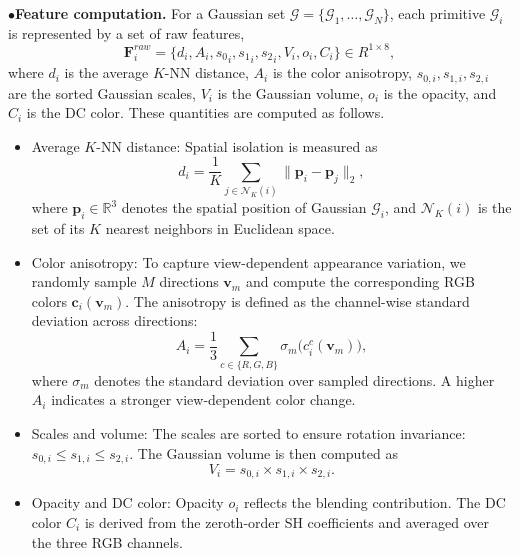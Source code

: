$\bullet$\textbf{Feature computation.}
For a Gaussian set $\mathcal{G} = \{\mathcal{G}_1, \ldots, \mathcal{G}_N\}$, each primitive $\mathcal{G}_i$ is represented by a set of raw features,
\begin{equation}
\label{equ:feature}
\mathbf{F}^{raw}_i = \{ d_i, A_i, {s_0}_i, {s_1}_i, {s_2}_i, V_i, o_i, C_i \} \in R^{1\times8},
\end{equation}
where $d_i$ is the average $K$-NN distance, $A_i$ is the color anisotropy, $s_{0,i},s_{1,i},s_{2,i}$ are the sorted Gaussian scales, $V_i$ is the Gaussian volume, $o_i$ is the opacity, and $C_i$ is the DC color. These quantities are computed as follows. 
\begin{itemize}
    \item Average $K$-NN distance:  
    Spatial isolation is measured as
    \begin{equation}
    d_i = \frac{1}{K} \sum_{j \in \mathcal{N}_K(i)} \| \mathbf{p}_i - \mathbf{p}_j \|_2,
    \end{equation}
    where $\mathbf{p}_i \in \mathbb{R}^3$ denotes the spatial position of Gaussian $\mathcal{G}_i$, and $\mathcal{N}_K(i)$ is the set of its $K$ nearest neighbors in Euclidean space.

    \item Color anisotropy:  
    To capture view-dependent appearance variation, we randomly sample $M$ directions $\mathbf{v}_m$ and compute the corresponding RGB colors $\mathbf{c}_i(\mathbf{v}_m)$.  
    The anisotropy is defined as the channel-wise standard deviation across directions:
    \begin{equation}
    A_i = \frac{1}{3} \sum_{c \in \{R,G,B\}} \sigma_m \big( c_i^c(\mathbf{v}_m) \big),
    \end{equation}
    where $\sigma_m$ denotes the standard deviation over sampled directions. A higher $A_i$ indicates a stronger view-dependent color change.
    
    \item Scales and volume:  
    The scales are sorted to ensure rotation invariance:
   $
    s_{0,i} \leq s_{1,i} \leq s_{2,i}.
    $
    The Gaussian volume is then computed as
    \begin{equation}
    V_i = s_{0,i} \times s_{1,i} \times s_{2,i}.
    \end{equation}

    \item Opacity and DC color:  
    Opacity $o_i$ reflects the blending contribution.  
    The DC color $C_i$ is derived from the zeroth-order SH coefficients and averaged over the three RGB channels.
\end{itemize}

